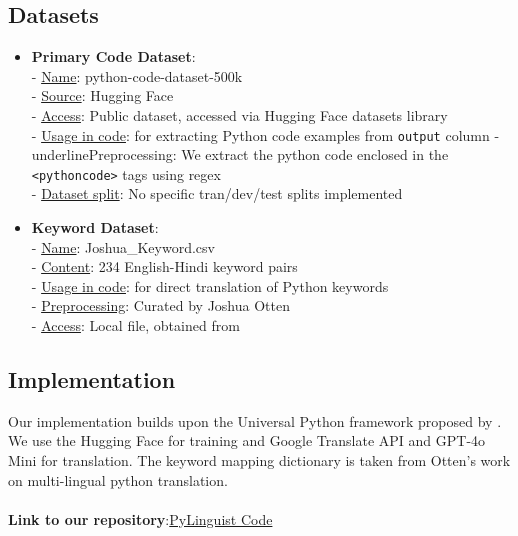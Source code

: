 \documentclass[11pt,a4paper]{article}
\begin{document}
\subsection{Datasets}
\begin{itemize}[itemsep=0pt, topsep=0pt]
    \item \textbf{Primary Code Dataset}:\\ 
    - \underline{Name}: python-code-dataset-500k\\
    - \underline{Source}: Hugging Face \cite{jtatman2021python}\\
    - \underline{Access}: Public dataset, accessed via Hugging Face datasets library\\
    - \underline{Usage in code}: for extracting Python code examples from \texttt{output} column
    - underline{Preprocessing}: We extract the python code enclosed in the \texttt{<pythoncode>} tags using regex\\ 
    - \underline{Dataset split}: No specific tran/dev/test splits implemented
    \item \textbf{Keyword Dataset}:\\
    - \underline{Name}: Joshua\_Keyword.csv\\
    - \underline{Content}: 234 English-Hindi keyword pairs\\
    - \underline{Usage in code}: for direct translation of Python keywords\\
    - \underline{Preprocessing}: Curated by Joshua Otten \cite{otten-etal-23-unipy}\\
    - \underline{Access}: Local file, obtained from \cite{otten2023unipy}
\end{itemize}

\subsection{Implementation} 
Our implementation builds upon the Universal Python framework proposed by \cite{otten2023unipy}. We use the Hugging Face \cite{jtatman2021python} for training and Google Translate API \cite{googletranslateapi} and GPT-4o Mini \cite{gpt4omini} for translation. The keyword mapping dictionary is taken from Otten's work \cite{otten-etal-23-unipy} on multi-lingual python translation.\\ \\ 
\textbf{Link to our repository}:\href{https://github.com/StringAna/PyLinguist/blob/main/code_trials/Project.ipynb}{PyLinguist Code}
\end{document}
